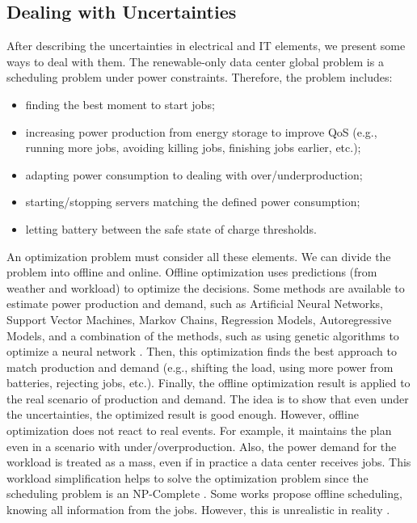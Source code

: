 
\subsection{Dealing with Uncertainties}
After describing the uncertainties in electrical and IT elements, we present some ways to deal with them. The renewable-only data center global problem is a scheduling problem under power constraints. Therefore, the problem includes:
\begin{itemize}
    \item finding the best moment to start jobs;
    \item increasing power production from energy storage to improve QoS (e.g., running more jobs, avoiding killing jobs, finishing jobs earlier, etc.);
    \item adapting power consumption to dealing with over/underproduction;
    \item starting/stopping servers matching the defined power consumption;
    \item letting battery between the safe state of charge thresholds.  
\end{itemize}

An optimization problem must consider all these elements. We can divide the problem into offline and online. Offline optimization uses predictions (from weather and workload) to optimize the decisions. Some methods are available to estimate power production and demand, such as Artificial Neural Networks, Support Vector Machines, Markov Chains, Regression Models, Autoregressive Models, and a combination of the methods, such as using genetic algorithms to optimize a neural network \cite{vashistha2020literature, masdari2020survey, ssekulima2016wind, sharma2018review, tuohy2015solar}. Then, this optimization finds the best approach to match production and demand (e.g., shifting the load, using more power from batteries, rejecting jobs, etc.). Finally, the offline optimization result is applied to the real scenario of production and demand. The idea is to show that even under the uncertainties, the optimized result is good enough. However, offline optimization does not react to real events. For example, it maintains the plan even in a scenario with under/overproduction. Also, the power demand for the workload is treated as a mass, even if in practice a data center receives jobs. This workload simplification helps to solve the optimization problem since the scheduling problem is an NP-Complete \cite{robert2009introduction, agrawal2021energy}. Some works propose offline scheduling, knowing all information from the jobs. However, this is unrealistic in reality \cite{robert2009introduction}.


